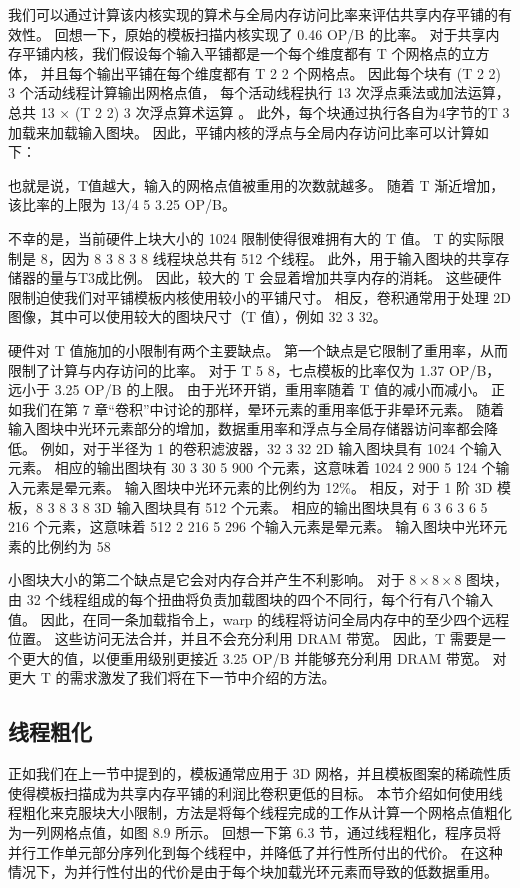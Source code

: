 我们可以通过计算该内核实现的算术与全局内存访问比率来评估共享内存平铺的有效性。 
回想一下，原始的模板扫描内核实现了 0.46 OP/B 的比率。 
对于共享内存平铺内核，我们假设每个输入平铺都是一个每个维度都有 T 个网格点的立方体，
并且每个输出平铺在每个维度都有 T 2 2 个网格点。 
因此每个块有 (T 2 2) 3 个活动线程计算输出网格点值，
每个活动线程执行 13 次浮点乘法或加法运算，总共 13 × (T 2 2) 3 次浮点算术运算 。 
此外，每个块通过执行各自为4字节的T 3 加载来加载输入图块。 因此，平铺内核的浮点与全局内存访问比率可以计算如下：

也就是说，T值越大，输入的网格点值被重用的次数就越多。 随着 T 渐近增加，该比率的上限为 13/4 5 3.25 OP/B。

不幸的是，当前硬件上块大小的 1024 限制使得很难拥有大的 T 值。 
T 的实际限制是 8，因为 8 3 8 3 8 线程块总共有 512 个线程。 此外，用于输入图块的共享存储器的量与T3成比例。 
因此，较大的 T 会显着增加共享内存的消耗。 这些硬件限制迫使我们对平铺模板内核使用较小的平铺尺寸。 
相反，卷积通常用于处理 2D 图像，其中可以使用较大的图块尺寸（T 值），例如 32 3 32。

硬件对 T 值施加的小限制有两个主要缺点。 第一个缺点是它限制了重用率，从而限制了计算与内存访问的比率。 
对于 T 5 8，七点模板的比率仅为 1.37 OP/B，远小于 3.25 OP/B 的上限。 由于光环开销，重用率随着 T 值的减小而减小。 
正如我们在第 7 章“卷积”中讨论的那样，晕环元素的重用率低于非晕环元素。 
随着输入图块中光环元素部分的增加，数据重用率和浮点与全局存储器访问率都会降低。 
例如，对于半径为 1 的卷积滤波器，32 3 32 2D 输入图块具有 1024 个输入元素。 
相应的输出图块有 30 3 30 5 900 个元素，这意味着 1024 2 900 5 124 个输入元素是晕元素。 
输入图块中光环元素的比例约为 12\%。 相反，对于 1 阶 3D 模板，8 3 8 3 8 3D 输入图块具有 512 个元素。 
相应的输出图块具有 6 3 6 3 6 5 216 个元素，这意味着 512 2 216 5 296 个输入元素是晕元素。 
输入图块中光环元素的比例约为 58%

小图块大小的第二个缺点是它会对内存合并产生不利影响。 
对于 $8 \times 8 \times 8$ 图块，由 32 个线程组成的每个扭曲将负责加载图块的四个不同行，每个行有八个输入值。 
因此，在同一条加载指令上，warp 的线程将访问全局内存中的至少四个远程位置。 这些访问无法合并，并且不会充分利用 DRAM 带宽。 
因此，T 需要是一个更大的值，以便重用级别更接近 3.25 OP/B 并能够充分利用 DRAM 带宽。 
对更大 T 的需求激发了我们将在下一节中介绍的方法。

\subsection{线程粗化}
正如我们在上一节中提到的，模板通常应用于 3D 网格，并且模板图案的稀疏性质使得模板扫描成为共享内存平铺的利润比卷积更低的目标。 
本节介绍如何使用线程粗化来克服块大小限制，方法是将每个线程完成的工作从计算一个网格点值粗化为一列网格点值，如图 8.9 所示。 
回想一下第 6.3 节，通过线程粗化，程序员将并行工作单元部分序列化到每个线程中，并降低了并行性所付出的代价。 
在这种情况下，为并行性付出的代价是由于每个块加载光环元素而导致的低数据重用。

